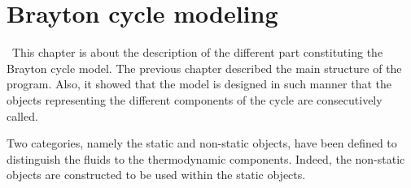 \graphicspath{{Chapitre_6/Images/}}
\chapter{Brayton cycle modeling}\label{C6}
\quad\, This chapter is about the description of the different part constituting the Brayton cycle model. The previous chapter described the main structure of the program. Also, it showed that the model is designed in such manner that the objects representing the different components of the cycle are consecutively called.

Two categories, namely the static and non-static objects, have been defined to distinguish the fluids to the thermodynamic components. Indeed, the non-static objects are constructed to be used within the static objects.
